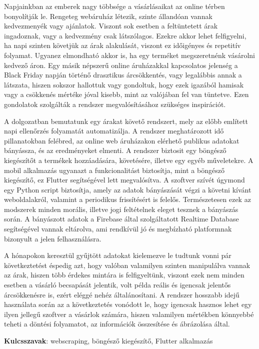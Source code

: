 Napjainkban az emberek nagy többsége a vásárlásaikat az online térben bonyolítják le. Rengeteg webáruház létezik, szinte állandóan vannak kedvezmenyék vagy ajánlatok. Viszont sok esetben a feltüntetett árak ingadoznak, vagy a kedvezmény csak látszólagos. Ezekre akkor lehet felfigyelni, ha napi szinten követjük az árak alakulását, viszont ez időigényes és repetitív folyamat. Ugyanez elmondható akkor is, ha egy terméket megszeretnénk vásárolni kedvező áron. Egy másik népszerű online áruházakkal kapcsolatos jelenség a Black Friday napján történő drasztikus árcsökkentés, vagy legalábbis annak a látszata, hiszen sokszor hallottuk vagy gondoltuk, hogy ezek igazából hamisak vagy a csökkenés mértéke jóval kisebb, mint az valójában fel van tüntetve. Ezen gondolatok szolgálták a rendszer megvalósításához szükséges inspirációt.

A dolgozatban bemutatunk egy árakat követő rendszert, mely az előbb említett napi ellenőrzés folyamatát automatizálja. A rendszer meghatározott idő pillanatokban felébred, az online web áruházakon elérhető publikus adatokat bányássza, és az eredményeket elmenti. A rendszer biztosit egy böngésző kiegészítőt a termékek hozzáadására, követésére, illetve egy egyéb műveletekre. A mobil alkalmazás ugyanazt a funkcionalitást biztosítja, mint a böngésző kiegészítő, ez Flutter segítségével lett megvalósítva. A szoftver szívét úgymond egy Python script biztosítja, amely az adatok bányászását végzi a követni kívánt weboldalakról, valamint a periodikus frissítésért is felelős. Természetesen ezek az modszerek minden morális, illetve jogi feltételnek eleget tesznek a bányászás során. A bányászott adatok a Firebase által szolgáltatott Realtime Database segítségével vannak eltárolva, ami rendkívül jó és megbízható platformnak bizonyult a jelen felhasználásra.

A hónapokon keresztül gyűjtött adatokat kielemezve le tudtunk vonni pár következtetést éspedig azt, hogy valóban valamilyen szinten manipulálva vannak az árak, hiszen több érdekes mintára is felfigyeltünk, viszont ezek nem minden esetben a vásárló becsapását jelentik, volt példa reális és igencsak jelentős árcsökkenésre is, ezért eléggé nehéz általánosítani. A rendszer hosszabb idejű használata során az a következtetés vonódott le, hogy igencsak hasznos lehet egy ilyen jellegű szoftver a vásárlok számára, hiszen valamilyen mértékben könnyebbé teheti a döntési folyamatot, az információk összesítése és ábrázolása által.

\textbf{Kulcsszavak}: webscraping, böngésző kiegészítő, Flutter alkalmazás